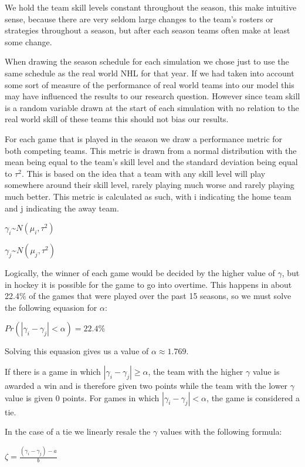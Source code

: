 \documentclass[
]{article}
\begin{document}
We hold the team skill levels constant throughout the season, this make
intuitive sense, because there are very seldom large changes to the
team's rosters or strategies throughout a season, but after each season
teams often make at least some change.

When drawing the season schedule for each simulation we chose just to
use the same schedule as the real world NHL for that year. If we had
taken into account some sort of measure of the performance of real world
teams into our model this may have influenced the results to our
research question. However since team skill is a random variable drawn
at the start of each simulation with no relation to the real world skill
of these teams this should not bias our results.

For each game that is played in the season we draw a performance metric
for both competing teams. This metric is drawn from a normal
distribution with the mean being equal to the team's skill level and the
standard deviation being equal to \(\tau^{2}\). This is based on the
idea that a team with any skill level will play somewhere around their
skill level, rarely playing much worse and rarely playing much better.
This metric is calculated as such, with i indicating the home team and j
indicating the away team.

\(\gamma_{i}\)\textasciitilde{}\(N(\mu_{i}, \tau^{2})\)

\(\gamma_{j}\)\textasciitilde{}\(N(\mu_{j}, \tau^{2})\)

Logically, the winner of each game would be decided by the higher value
of \(\gamma\), but in hockey it is possible for the game to go into
overtime. This happens in about 22.4\% of the games that were played
over the past 15 seasons, so we must solve the following equasion for
\(\alpha\):

\(Pr(|\gamma_{i}-\gamma_{j}| < \alpha) = 22.4\)\%

Solving this equasion gives us a value of \(\alpha \approx 1.769.\)

If there is a game in which \(|\gamma_{i}-\gamma_{j}|\geq \alpha\), the
team with the higher \(\gamma\) value is awarded a win and is therefore
given two points while the team with the lower \(\gamma\) value is given
0 points. For games in which \(|\gamma_{i}-\gamma_{j}| < \alpha\), the
game is considered a tie.

In the case of a tie we linearly resale the \(\gamma\) values with the
following formula:

\(\zeta = \frac{(\gamma_{i}-\gamma_{j}) - a}{b}\)
\end{document}

